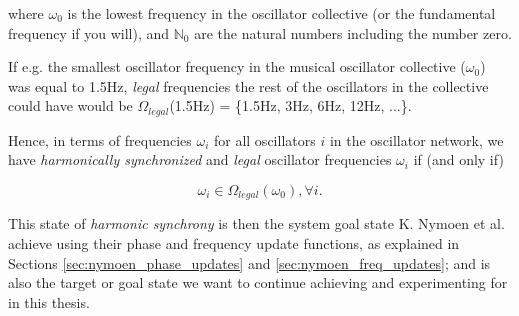 	where $\omega_{0}$ is the lowest frequency in the oscillator collective (or the fundamental frequency if you will), and $\mathbb{N}_0$ are the natural numbers including the number zero. \nl

	If e.g. the smallest oscillator frequency in the musical oscillator collective ($\omega_0$) was equal to 1.5Hz, \textit{legal} frequencies the rest of the oscillators in the collective could have would be $\Omega_{legal}$(1.5Hz) = \{1.5Hz, 3Hz, 6Hz, 12Hz, ...\}.

	Hence, in terms of frequencies $\omega_i$ for all oscillators $i$ in the oscillator network, we have \textit{harmonically synchronized} and \textit{legal} oscillator frequencies $\omega_i$ if (and only if)

	\begin{equation}\label{synced_freqs}
	\omega_i \in \Omega_{legal}(\omega_0) , \forall i.
	\end{equation} \nl

	This state of \textit{harmonic synchrony} is then the system goal state K. Nymoen et al. achieve using their phase and frequency update functions, as explained in Sections \ref{sec:nymoen_phase_updates} and \ref{sec:nymoen_freq_updates}; and is also the target or goal state we want to continue achieving and experimenting for in this thesis.
	
	
	
	
	
	
	
